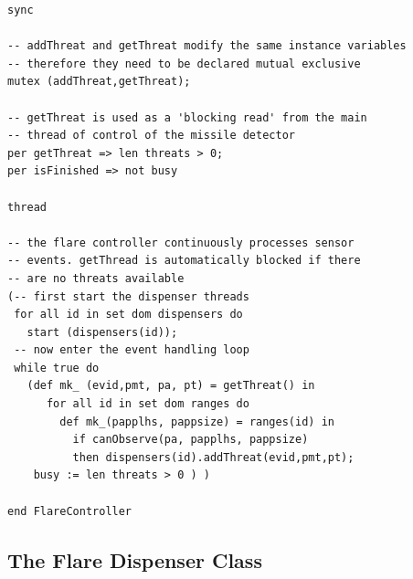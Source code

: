 \documentclass{overturerepchap}
\begin{document}
\begin{lstlisting}
sync

-- addThreat and getThreat modify the same instance variables
-- therefore they need to be declared mutual exclusive
mutex (addThreat,getThreat);

-- getThreat is used as a 'blocking read' from the main
-- thread of control of the missile detector
per getThreat => len threats > 0;
per isFinished => not busy

thread

-- the flare controller continuously processes sensor
-- events. getThread is automatically blocked if there
-- are no threats available
(-- first start the dispenser threads
 for all id in set dom dispensers do
   start (dispensers(id));
 -- now enter the event handling loop
 while true do
   (def mk_ (evid,pmt, pa, pt) = getThreat() in
      for all id in set dom ranges do
        def mk_(papplhs, pappsize) = ranges(id) in
          if canObserve(pa, papplhs, pappsize)
          then dispensers(id).addThreat(evid,pmt,pt);
    busy := len threats > 0 ) )

end FlareController
\end{lstlisting}

\subsection{The Flare Dispenser Class}
\end{document}
